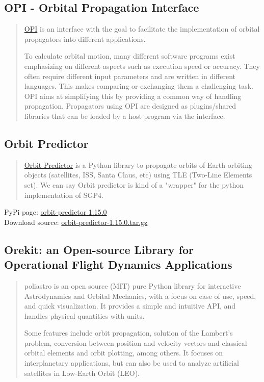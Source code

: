 \documentclass[a4paper,10pt]{article}
\begin{document}
\subsection{OPI - Orbital Propagation Interface}
\begin{quotation}
\href{https://github.com/Space-Systems/OPI}{OPI} is an interface with the goal to facilitate the implementation of orbital propagators into different applications.

To calculate orbital motion, many different software programs exist emphasizing on different aspects such as execution speed or accuracy. They often require different input parameters and are written in different languages. This makes comparing or exchanging them a challenging task. OPI aims at simplifying this by providing a common way of handling propagation. Propagators using OPI are designed as plugins/shared libraries that can be loaded by a host program via the interface.
\end{quotation}

\subsection{Orbit Predictor}
\begin{quotation}
\href{https://github.com/satellogic/orbit-predictor}{Orbit Predictor} is a Python library to propagate orbits of Earth-orbiting objects (satellites, ISS, Santa Claus, etc) using TLE (Two-Line Elements set). We can say Orbit predictor is kind of a "wrapper" for the python implementation of SGP4.
\end{quotation}

PyPi page: \href{https://pypi.org/project/orbit-predictor/}{orbit-predictor 1.15.0} \\
Download source: \href{https://files.pythonhosted.org/packages/c2/98/c1497925d73f522d17a2db3e704a85fdad17fcd191464b82fad82e73aedb/orbit-predictor-1.15.0.tar.gz}{orbit-predictor-1.15.0.tar.gz}


\subsection{Orekit: an Open-source Library for Operational Flight Dynamics Applications}
\begin{quotation}
poliastro is an open source (MIT) pure Python library for interactive Astrodynamics and Orbital Mechanics, with a focus on ease of use, speed, and quick visualization. It provides a simple and intuitive API, and handles physical quantities with units.

Some features include orbit propagation, solution of the Lambert's problem, conversion between position and velocity vectors and classical orbital elements and orbit plotting, among others. It focuses on interplanetary applications, but can also be used to analyze artificial satellites in Low-Earth Orbit (LEO).
\end{quotation}
\end{document}
